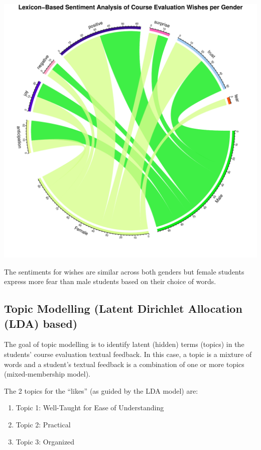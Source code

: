 \documentclass[
]{article}
\begin{document}
\includegraphics{Mid-SemesterCourseEvaluation-20240819-20241125-ADB-BBIT2.2_files/figure-latex/ChordDiagramPerGender_Wishes-1.pdf}

The sentiments for wishes are similar across both genders but female
students express more fear than male students based on their choice of
words.

\newpage

\subsection{Topic Modelling (Latent Dirichlet Allocation (LDA)
based)}\label{topic-modelling-latent-dirichlet-allocation-lda-based}

The goal of topic modelling is to identify latent (hidden) terms
(topics) in the students' course evaluation textual feedback. In this
case, a topic is a mixture of words and a student's textual feedback is
a combination of one or more topics (mixed-membership model).

The 2 topics for the ``likes'' (as guided by the LDA model) are:

\begin{enumerate}
\def\labelenumi{\arabic{enumi}.}
\item
  Topic 1: Well-Taught for Ease of Understanding
\item
  Topic 2: Practical
\item
  Topic 3: Organized
\end{enumerate}
\end{document}
